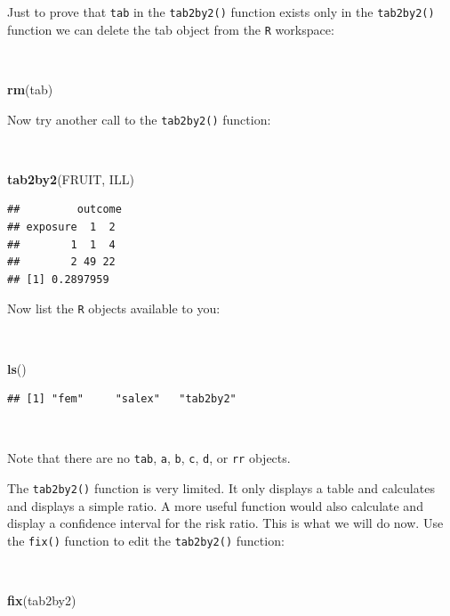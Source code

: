 \documentclass[12pt,a4paper]{book}
\newenvironment{Shaded}{\begin{snugshade}}{\end{snugshade}}
\newcommand{\KeywordTok}[1]{\textcolor[rgb]{0.13,0.29,0.53}{\textbf{#1}}}
\newcommand{\NormalTok}[1]{#1}
\theoremstyle{definition}
\theoremstyle{definition}
\theoremstyle{definition}
\theoremstyle{remark}
\begin{document}
Just to prove that \texttt{tab} in the \texttt{tab2by2()} function
exists only in the \texttt{tab2by2()} function we can delete the tab
object from the \texttt{R} workspace:

~

\begin{Shaded}
\begin{Highlighting}[]
\KeywordTok{rm}\NormalTok{(tab)}
\end{Highlighting}
\end{Shaded}

Now try another call to the \texttt{tab2by2()} function:

~

\begin{Shaded}
\begin{Highlighting}[]
\KeywordTok{tab2by2}\NormalTok{(FRUIT, ILL)}
\end{Highlighting}
\end{Shaded}

\begin{verbatim}
##         outcome
## exposure  1  2
##        1  1  4
##        2 49 22
## [1] 0.2897959
\end{verbatim}

\newpage

Now list the \texttt{R} objects available to you:

~

\begin{Shaded}
\begin{Highlighting}[]
\KeywordTok{ls}\NormalTok{()}
\end{Highlighting}
\end{Shaded}

\begin{verbatim}
## [1] "fem"     "salex"   "tab2by2"
\end{verbatim}

~

Note that there are no \texttt{tab}, \texttt{a}, \texttt{b}, \texttt{c},
\texttt{d}, or \texttt{rr} objects.

The \texttt{tab2by2()} function is very limited. It only displays a
table and calculates and displays a simple ratio. A more useful function
would also calculate and display a confidence interval for the risk
ratio. This is what we will do now. Use the \texttt{fix()} function to
edit the \texttt{tab2by2()} function:

~

\begin{Shaded}
\begin{Highlighting}[]
\KeywordTok{fix}\NormalTok{(tab2by2)}
\end{Highlighting}
\end{Shaded}
\end{document}
